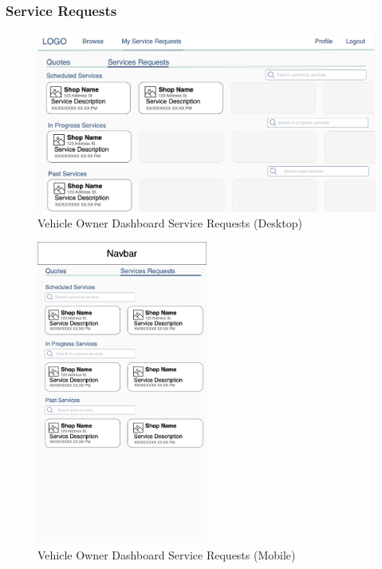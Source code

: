 \documentclass[12pt, titlepage]{article}
\begin{document}
\subsubsection{Service Requests}

\begin{figure}[H]
	\centering
	\includegraphics[width=\textwidth]{mockups/Vehicle Owner Dashboard (Service Requests) (Desktop).png}
	\caption{Vehicle Owner Dashboard \textemdash{} Service Requests (Desktop)}
\end{figure}

\begin{figure}[H]
	\centering
	\includegraphics[width=0.5\textwidth]{mockups/Vehicle Owner Dashboard (Service Requests) (Mobile).png}
	\caption{Vehicle Owner Dashboard \textemdash{} Service Requests (Mobile)}
\end{figure}
\end{document}
